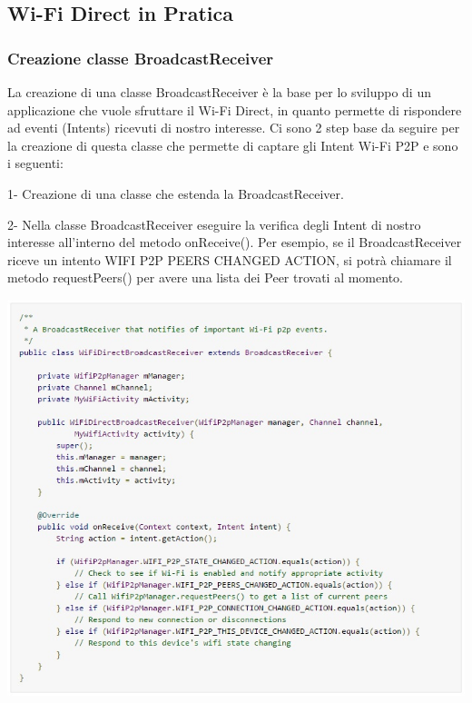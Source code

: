 \subsection{Wi-Fi Direct in Pratica}

\subsubsection{Creazione classe BroadcastReceiver}

La creazione di una classe BroadcastReceiver è la base per lo sviluppo di un applicazione che vuole sfruttare il Wi-Fi Direct, in quanto permette di rispondere ad eventi (Intents) ricevuti di nostro interesse.
Ci sono 2 step base da seguire per la creazione di questa classe che permette di captare gli Intent Wi-Fi P2P e sono i seguenti:

1- Creazione di una classe che estenda la BroadcastReceiver.

2- Nella classe BroadcastReceiver eseguire la verifica degli Intent di nostro interesse all'interno del metodo       onReceive().
   Per esempio, se il BroadcastReceiver riceve un intento WIFI P2P PEERS CHANGED ACTION, si potrà chiamare il        metodo requestPeers() per avere una lista dei Peer trovati al momento.
   

\begin{center}
\includegraphics[width=1\textwidth]{imgs/broadcastreceiver.jpg}
\label{broadcastreceiver_img}%
\end{center}

